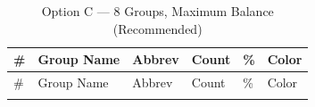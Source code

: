 \documentclass[
  11pt,
  letterpaper,
]{report}
\begin{document}
\begin{longtable}[]{@{}
  >{\raggedleft\arraybackslash}p{}
  >{\raggedright\arraybackslash}p{}
  >{\centering\arraybackslash}p{}
  >{\raggedleft\arraybackslash}p{}
  >{\raggedleft\arraybackslash}p{}
  >{\raggedright\arraybackslash}p{}@{}}
\caption{Option C --- 8 Groups, Maximum Balance
(Recommended)}\label{tbl-optionC}\tabularnewline
\toprule\noalign{}
\begin{minipage}[b]{\linewidth}\raggedleft
\#
\end{minipage} & \begin{minipage}[b]{\linewidth}\raggedright
Group Name
\end{minipage} & \begin{minipage}[b]{\linewidth}\centering
Abbrev
\end{minipage} & \begin{minipage}[b]{\linewidth}\raggedleft
Count
\end{minipage} & \begin{minipage}[b]{\linewidth}\raggedleft
\%
\end{minipage} & \begin{minipage}[b]{\linewidth}\raggedright
Color
\end{minipage} \\
\midrule\noalign{}
\endfirsthead
\toprule\noalign{}
\begin{minipage}[b]{\linewidth}\raggedleft
\#
\end{minipage} & \begin{minipage}[b]{\linewidth}\raggedright
Group Name
\end{minipage} & \begin{minipage}[b]{\linewidth}\centering
Abbrev
\end{minipage} & \begin{minipage}[b]{\linewidth}\raggedleft
Count
\end{minipage} & \begin{minipage}[b]{\linewidth}\raggedleft
\%
\end{minipage} & \begin{minipage}[b]{\linewidth}\raggedright
Color
\end{minipage} \\
\midrule\noalign{}
\endhead
\bottomrule\noalign{}
\endlastfoot

\end{longtable}
\end{document}
